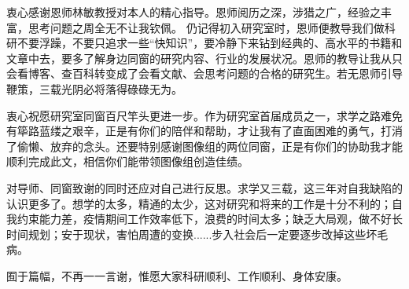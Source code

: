 \begin{acknowledgement}
    衷心感谢恩师林敏教授对本人的精心指导。恩师阅历之深，涉猎之广，经验之丰富，思考问题之周全无不让我钦佩。
    仍记得初入研究室时，恩师便教导我们做科研不要浮躁，不要只追求一些“快知识”，要冷静下来钻到经典的、高水平的书籍和文章中去，要多了解身边同窗的研究内容、行业的发展状况。恩师的教导让我从只会看博客、查百科转变成了会看文献、会思考问题的合格的研究生。若无恩师引导鞭策，三载光阴必将落得碌碌无为。

    衷心祝愿研究室同窗百尺竿头更进一步。作为研究室首届成员之一，求学之路难免有筚路蓝缕之艰辛，正是有你们的陪伴和帮助，才让我有了直面困难的勇气，打消了偷懒、放弃的念头。还要特别感谢图像组的两位同窗，正是有你们的协助我才能顺利完成此文，相信你们能带领图像组创造佳绩。

    对导师、同窗致谢的同时还应对自己进行反思。求学又三载，这三年对自我缺陷的认识更多了。想学的太多，精通的太少，这对研究和将来的工作是十分不利的；自我约束能力差，疫情期间工作效率低下，浪费的时间太多；缺乏大局观，做不好长时间规划；安于现状，害怕周遭的变换......步入社会后一定要逐步改掉这些坏毛病。

    囿于篇幅，不再一一言谢，惟愿大家科研顺利、工作顺利、身体安康。
\end{acknowledgement}
